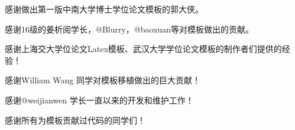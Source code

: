 \begin{acknowledgements} 

    感谢做出第一版中南大学博士学位论文模板的郭大侠。

    感谢16级的姜析阅学长，@Blurry，@baoxuan等对模板做出的贡献。

    感谢上海交大学位论文Latex模板、武汉大学学位论文模板的制作者们提供的经验！

    感谢William Wang 同学对模板移植做出的巨大贡献！

    感谢@weijianwen 学长一直以来的开发和维护工作！

    感谢所有为模板贡献过代码的同学们！
\end{acknowledgements}
